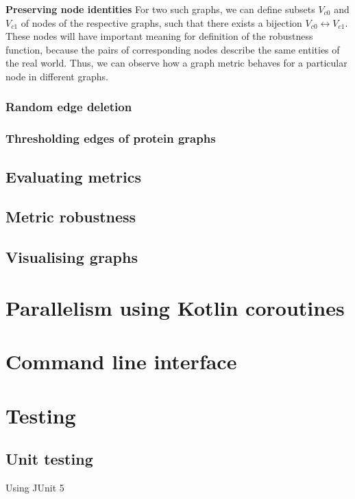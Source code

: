 \textbf{Preserving node identities} For two such graphs, we can define subsets $V_{c0}$ and $V_{c1}$ of nodes of the respective graphs, such that there exists a bijection $V_{c0} \leftrightarrow V_{c1}$.
These nodes will have important meaning for definition of the robustness function, because the pairs of corresponding nodes describe the same entities of the real world.
Thus, we can observe how a graph metric behaves for a particular node in different graphs.


\subsubsection{Random edge deletion}

\subsubsection{Thresholding edges of protein graphs}


\subsection{Evaluating metrics}


\subsection{Metric robustness}


\subsection{Visualising graphs}


\section{Parallelism using Kotlin coroutines}

\section{Command line interface}




\section{Testing}

\subsection{Unit testing}
Using JUnit 5

